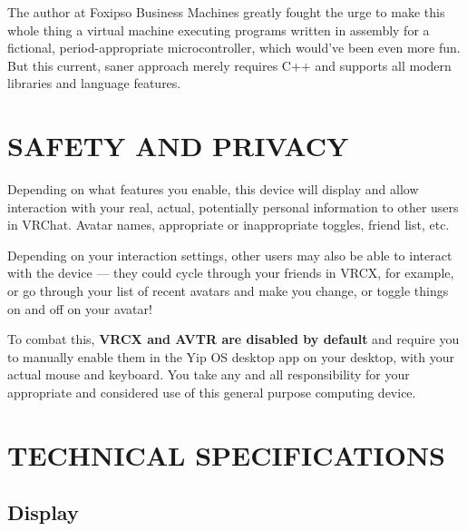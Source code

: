 \documentclass[10pt]{article}
\begin{document}
The author at Foxipso Business Machines greatly fought the urge to make this whole thing a virtual machine executing programs written in assembly for a fictional, period-appropriate microcontroller, which would've been even more fun. But this current, saner approach merely requires C++ and supports all modern libraries and language features.

\section{SAFETY AND PRIVACY}
\label{sec:safety}

\begin{warnbox}[CAUTION]
Depending on what features you enable, this device will display and allow interaction with your real, actual, potentially personal information to other users in VRChat. Avatar names, appropriate or inappropriate toggles, friend list, etc.

Depending on your interaction settings, other users may also be able to interact with the device --- they could cycle through your friends in VRCX, for example, or go through your list of recent avatars and make you change, or toggle things on and off on your avatar!

To combat this, \textbf{VRCX and AVTR are disabled by default} and require you to manually enable them in the Yip OS desktop app on your desktop, with your actual mouse and keyboard. You take any and all responsibility for your appropriate and considered use of this general purpose computing device.
\end{warnbox}

\newpage
\section{TECHNICAL SPECIFICATIONS}
\label{sec:technical}

\subsection{Display}
\end{document}
